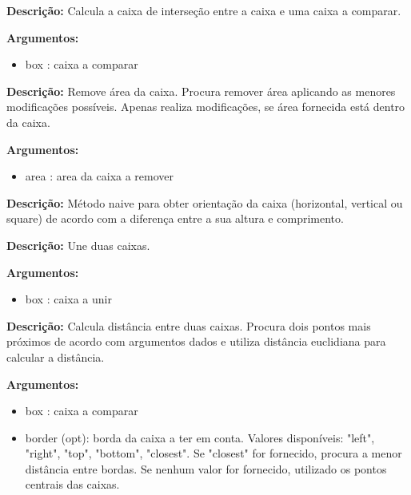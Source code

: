 
\textbf{Descrição:} Calcula a caixa de interseção entre a caixa e uma caixa a comparar.

\textbf{Argumentos:}
\begin{itemize}\setlength\itemsep{-0.3em}
	\vspace{-0.5em}
	\item box : caixa a comparar
\end{itemize}



\textbf{Descrição:} Remove área da caixa. Procura remover área aplicando as menores modificações possíveis. Apenas realiza modificações, se área fornecida está dentro da caixa.

\textbf{Argumentos:}
\begin{itemize}\setlength\itemsep{-0.3em}
	\vspace{-0.5em}
	\item area : area da caixa a remover
\end{itemize}



\textbf{Descrição:} Método naive para obter orientação da caixa (horizontal, vertical ou square) de acordo com a diferença entre a sua altura e comprimento.



\textbf{Descrição:} Une duas caixas.

\textbf{Argumentos:}
\begin{itemize}\setlength\itemsep{-0.3em}
	\vspace{-0.5em}
	\item box : caixa a unir
\end{itemize}


\textbf{Descrição:} Calcula distância entre duas caixas. Procura dois pontos mais próximos de acordo com argumentos dados e utiliza distância euclidiana para calcular a distância.

\textbf{Argumentos:}
\begin{itemize}\setlength\itemsep{-0.3em}
	\vspace{-0.5em}
	\item box : caixa a comparar
	\item border (opt): borda da caixa a ter em conta. Valores disponíveis: "left", "right", "top", "bottom", "closest". Se "closest" for fornecido, procura a menor distância entre bordas. Se nenhum valor for fornecido, utilizado os pontos centrais das caixas.
\end{itemize}


